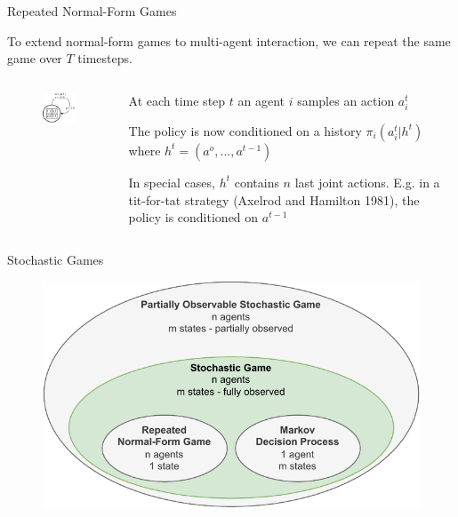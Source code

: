 \begin{frame}{Repeated Normal-Form Games}

To extend normal-form games to  multi-agent interaction, we can repeat the same game over \(T\) timesteps. 

    \begin{columns}
    \begin{column}{0.4\linewidth}
    \begin{figure}
        \centering
        \includegraphics{images/chapter_3/game-models-mg.pdf}
        \label{fig:enter-label}
    \end{figure}
    \end{column}

    \begin{column}{0.6\linewidth}

    \blist
        \item At each time step \(t\) an agent $i$ samples an action \(a^{t}_{i}\)
        \item The policy is now conditioned on a  history \(\pi_i(a_{i}^{t}|h^t)\) where \(h^t = (a^o, ..., a^{t-1})\)
        \item In special cases, $h^t$ contains $n$ last joint actions. E.g. in a tit-for-tat strategy (Axelrod and Hamilton 1981), the policy is conditioned on \(a^{t-1}\)
    \elist
        
    \end{column}
    \end{columns}
\end{frame}

\begin{frame}{Stochastic Games}

\begin{figure}
    \centering
    \includegraphics{images/chapter_3/stochastic_games_hierarchy.pdf}
\end{figure}
\end{frame}

